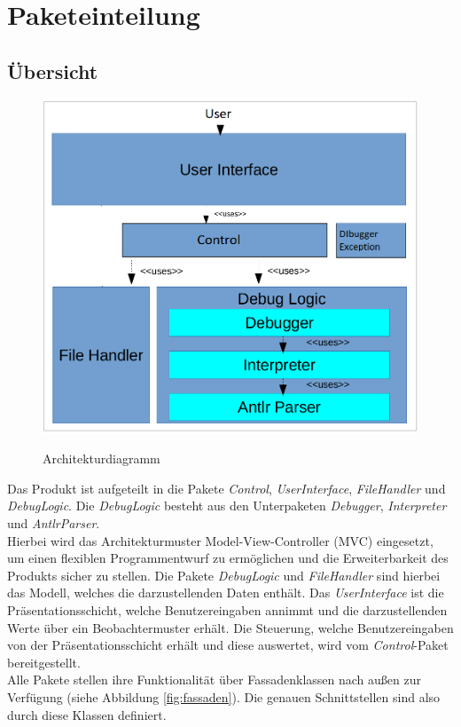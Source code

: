 \documentclass[parskip=full]{scrartcl}
\begin{document}
\newpage


\section{Paketeinteilung}\label{Packages} %

\subsection{Übersicht}

\begin{figure}[!h]
\centering
\includegraphics[scale=0.35]{../Plichtenheft/Architektur.png} \\
\caption{Architekturdiagramm}
\end{figure}
Das Produkt ist aufgeteilt in die Pakete \textit{Control}, \textit{UserInterface}, \textit{FileHandler} und \textit{DebugLogic}.
Die \textit{DebugLogic} besteht aus den Unterpaketen \textit{Debugger}, \textit{Interpreter} und
\textit{AntlrParser}.\\
Hierbei wird das Architekturmuster Model-View-Controller (MVC) eingesetzt, um einen flexiblen Programmentwurf zu ermöglichen und die Erweiterbarkeit des Produkts sicher zu stellen. Die Pakete \textit{DebugLogic} und \textit{FileHandler} sind hierbei das Modell, welches die darzustellenden Daten enthält. Das \textit{UserInterface} ist die Präsentationsschicht, welche Benutzereingaben annimmt und die darzustellenden Werte über ein Beobachtermuster erhält. Die Steuerung, welche Benutzereingaben von der Präsentationsschicht erhält und diese auswertet, wird vom \textit{Control}-Paket bereitgestellt. \\
Alle Pakete stellen ihre Funktionalität über Fassadenklassen nach außen zur Verfügung (siehe Abbildung \ref{fig:fassaden}). Die genauen Schnittstellen sind also durch diese Klassen definiert.
\end{document}
